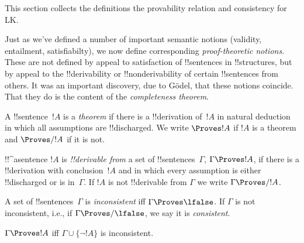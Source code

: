\documentclass[../../../include/open-logic-section]{subfiles}
\begin{document}

\begin{editorial}
This section collects the definitions the provability relation
and consistency for LK.
\end{editorial}

\begin{explain}
Just as we've defined a number of important semantic notions
(validity, entailment, satisfiabilty), we now define corresponding
\emph{proof-theoretic notions}.  These are not defined by appeal to
satisfaction of !!{sentence}s in !!{structure}s, but by appeal to the
!!{derivability} or !!{nonderivability} of certain !!{sentence}s from
others.  It was an important discovery, due to G\"odel, that these
notions coincide.  That they do is the content of the
\emph{completeness theorem}.
\end{explain}


\begin{defn}[Theorems]
A !!{sentence}~$!A$ is a \emph{theorem} if there is a !!{derivation}
of~$!A$ in natural deduction in which all assumptions are
!!{discharged}.  We write $\Proves !A$ if $!A$ is a theorem and
$\Proves/ !A$ if it is not.
\end{defn}

\begin{defn}[!!^{derivability}]
!!^a{sentence} $!A$ is \emph{!!{derivable} from} a set of
!!{sentence}s~$\Gamma$, $\Gamma \Proves !A$, if there is a
!!{derivation} with conclusion~$!A$ and in which every assumption
is either !!{discharged} or is in~$\Gamma$. If $!A$ is not
!!{derivable} from $\Gamma$ we write $\Gamma \Proves/ !A$.
\end{defn}

\begin{defn}[Consistency]
A set of !!{sentence}s~$\Gamma$ is \emph{inconsistent} iff $\Gamma
\Proves \lfalse$.  If $\Gamma$ is not inconsistent, i.e., if
$\Gamma \Proves/ \lfalse$, we say it is \emph{consistent}.
\end{defn}

\begin{prop}
$\Gamma \Proves !A$ iff $\Gamma \cup \{\lnot !A\}$ is inconsistent.
\end{prop}
\end{document}
